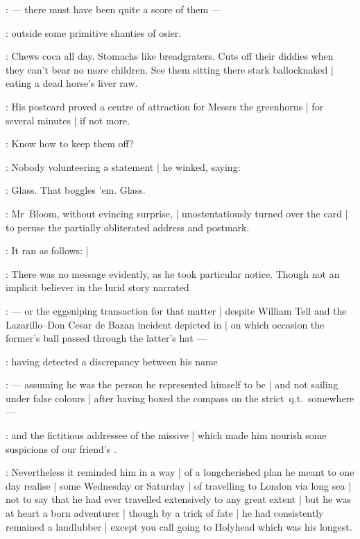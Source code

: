 :
    --- there must have been quite a score of them ---

:
outside some primitive shanties of osier.

\Murphy:
Chews coca all day.
Stomachs like breadgraters.
Cuts off their diddies when they can't bear no more children.
See them sitting there stark ballocknaked |
eating a dead horse's liver raw.

:
His postcard proved a centre of attraction for Messrs the greenhorns |
for several minutes |
if not more.

\Murphy:
Know how to keep them off?

:
Nobody volunteering a statement |
he winked, saying:

\Murphy:
Glass.
That boggles 'em.
Glass.

:
Mr~Bloom, without evincing surprise, |
unostentatiously turned over the card |
to peruse the partially obliterated address and postmark.

:
It ran as follows: |

:
There was no message evidently, as he took particular notice.
Though not an implicit believer in the lurid story narrated

:
    --- or the eggsniping transaction for that matter |
        despite William Tell and the Lazarillo--Don Cesar de Bazan incident
        depicted in  |
        on which occasion the former's ball passed through the latter's hat ---

:
having detected a discrepancy between his name

:
    --- assuming he was the person he represented himself to be |
        and not sailing under false colours |
        after having boxed the compass on the strict~q.t.\ somewhere ---

:
and the fictitious addressee of the missive |
which made him nourish some suspicions of our friend's .

:
Nevertheless it reminded him in a way |
of a longcherished plan he meant to one day realise |
some Wednesday or Saturday |
of travelling to London via long sea |
not to say that he had ever travelled extensively to any great extent |
but he was at heart a born adventurer |
though by a trick of fate |
he had consistently remained a landlubber |
except you call going to Holyhead which was his longest.

